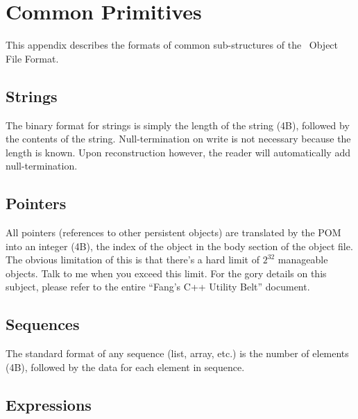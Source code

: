 
\chapter{Common Primitives}
\label{app:common}

This appendix describes the formats of common sub-structures of
the \hackt\ Object File Format.  

\section{Strings}
\label{app:common:strings}

The binary format for strings is simply the length of the string (4B), 
followed by the contents of the string.  
Null-termination on write is not necessary because the length is known.  
Upon reconstruction however, 
the reader will automatically add null-termination.  

\section{Pointers}
\label{app:common:pointers}

All pointers (references to other persistent objects) are translated
by the POM into an integer (4B), 
the index of the object in the body section of the object file.  
The obvious limitation of this is that there's a hard limit of 
$2^{32}$ manageable objects.  
Talk to me when you exceed this limit.  
For the gory details on this subject, please refer to the entire
``Fang's C++ Utility Belt'' document.  

\section{Sequences}
\label{app:common:sequence}

The standard format of any sequence (list, array, etc.)
is the number of elements (4B), followed by the data for each
element in sequence.  

\section{Expressions}
\label{app:common:expr}

